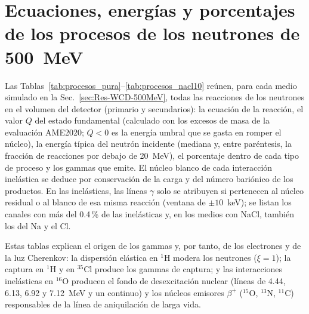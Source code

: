 \chapter{Ecuaciones, energías y porcentajes de los procesos de los neutrones de 500~MeV}
\label{ap:procesos-neutrones}

Las Tablas~\ref{tab:procesos_pura}--\ref{tab:procesos_nacl10} reúnen, para cada medio simulado en la Sec.~\ref{sec:Res-WCD-500MeV}, todas las reacciones de los neutrones en el volumen del detector (primario y secundarios): la ecuación de la reacción, el valor $Q$ del estado fundamental (calculado con los excesos de masa de la evaluación AME2020; $Q<0$ es la energía umbral que se gasta en romper el núcleo), la energía típica del neutrón incidente (mediana y, entre paréntesis, la fracción de reacciones por debajo de 20~MeV), el porcentaje dentro de cada tipo de proceso y los gammas que emite. El núcleo blanco de cada interacción inelástica se deduce por conservación de la carga y del número bariónico de los productos. En las inelásticas, las líneas $\gamma$ solo se atribuyen si pertenecen al núcleo residual o al blanco de esa misma reacción (ventana de $\pm10$~keV); se listan los canales con más del 0.4\,\% de las inelásticas y, en los medios con NaCl, también los del Na y el Cl.

Estas tablas explican el origen de los gammas y, por tanto, de los electrones y de la luz Cherenkov: la dispersión elástica en $^{1}$H modera los neutrones ($\xi=1$); la captura en $^{1}$H y en $^{35}$Cl produce los gammas de captura; y las interacciones inelásticas en $^{16}$O producen el fondo de desexcitación nuclear (líneas de 4.44, 6.13, 6.92 y 7.12~MeV y un continuo) y los núcleos emisores $\beta^{+}$ ($^{15}$O, $^{13}$N, $^{11}$C) responsables de la línea de aniquilación de larga vida.

